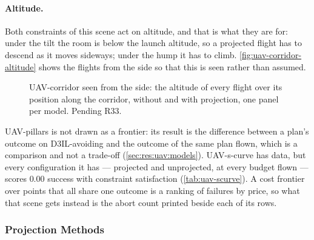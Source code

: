 \paragraph{Altitude.} Both constraints of this scene act on altitude, and that is what they are for: under
the tilt the room is below the launch altitude, so a projected flight has to descend as it moves sideways;
under the hump it has to climb. \autoref{fig:uav-corridor-altitude} shows the flights from the side so that
this is seen rather than assumed. 

\begin{figure}[htpb]
  \centering
  \caption[UAV-corridor: flown altitude, without and with projection]{UAV-corridor seen from the side: the
  altitude of every flight over its position along the corridor, without and with projection, one panel
  per model. Pending R33.}
  \label{fig:uav-corridor-altitude}
\end{figure}

UAV-pillars is not drawn as a frontier: its result is the difference between a plan's outcome on
D3IL-avoiding and the outcome of the same plan flown, which is a comparison and not a trade-off
(\autoref{sec:res:uav:models}). UAV-s-curve has data, but every
configuration it has --- projected and unprojected, at every budget flown --- scores $0.00$ success with
constraint satisfaction (\autoref{tab:uav-scurve}). A cost frontier
over points that all share one outcome is a ranking of failures by price, so what that scene gets instead
is the abort count printed beside each of its rows.

\FloatBarrier

\FloatBarrier

\FloatBarrier
\subsubsection{Projection Methods}\label{sec:res:uav:projection}

